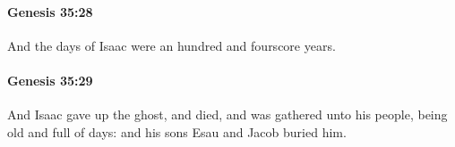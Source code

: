 		\paragraph{Genesis 35:28} %
			\label{GENESIS-35-28}

			And the days of Isaac were an hundred and fourscore years.


		\paragraph{Genesis 35:29} %
			\label{GENESIS-35-29}

			And Isaac gave up the ghost, and died, and was gathered unto his people, being old and full of days: and his sons Esau and Jacob buried him.


